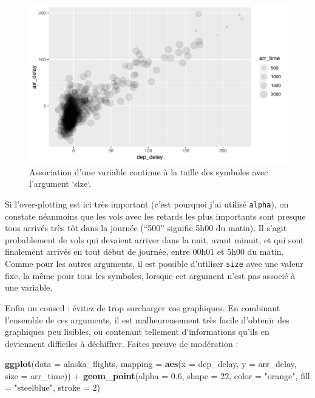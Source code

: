 \documentclass[
  a4paper,
]{article}
\newenvironment{Shaded}{\begin{snugshade}}{\end{snugshade}}
\newcommand{\DataTypeTok}[1]{\textcolor[rgb]{0.00,0.34,0.68}{#1}}
\newcommand{\DecValTok}[1]{\textcolor[rgb]{0.69,0.50,0.00}{#1}}
\newcommand{\FloatTok}[1]{\textcolor[rgb]{0.69,0.50,0.00}{#1}}
\newcommand{\KeywordTok}[1]{\textcolor[rgb]{0.12,0.11,0.11}{\textbf{#1}}}
\newcommand{\NormalTok}[1]{\textcolor[rgb]{0.12,0.11,0.11}{#1}}
\newcommand{\OperatorTok}[1]{\textcolor[rgb]{0.12,0.11,0.11}{#1}}
\newcommand{\StringTok}[1]{\textcolor[rgb]{0.75,0.01,0.01}{#1}}
\begin{document}
\begin{figure}[htpb]

{\centering \includegraphics[width=0.9\linewidth]{figure/sizeplot-1} 

}

\caption{Association d'une variable continue à la taille des symboles avec l'argument `size`.}\label{fig:sizeplot}
\end{figure}

Si l'over-plotting est ici très important (c'est pourquoi j'ai utilisé \texttt{alpha}), on constate néanmoins que les vols avec les retards les plus importants sont presque tous arrivés très tôt dans la journée (``500'' signifie 5h00 du matin). Il s'agit probablement de vols qui devaient arriver dans la nuit, avant minuit, et qui sont finalement arrivés en tout début de journée, entre 00h01 et 5h00 du matin. Comme pour les autres arguments, il est possible d'utiliser \texttt{size} avec une valeur fixe, la même pour tous les symboles, lorsque cet argument n'est pas associé à une variable.

Enfin un conseil : évitez de trop surcharger vos graphiques. En combinant l'ensemble de ces arguments, il est malheureusement très facile d'obtenir des graphiques peu lisibles, ou contenant tellement d'informations qu'ils en deviennent difficiles à déchiffrer. Faites preuve de modération :

\begin{Shaded}
\begin{Highlighting}[]
\KeywordTok{ggplot}\NormalTok{(}\DataTypeTok{data =}\NormalTok{ alaska_flights, }
       \DataTypeTok{mapping =} \KeywordTok{aes}\NormalTok{(}\DataTypeTok{x =}\NormalTok{ dep_delay, }\DataTypeTok{y =}\NormalTok{ arr_delay, }\DataTypeTok{size =}\NormalTok{ arr_time)) }\OperatorTok{+}
\StringTok{  }\KeywordTok{geom_point}\NormalTok{(}\DataTypeTok{alpha =} \FloatTok{0.6}\NormalTok{, }
             \DataTypeTok{shape =} \DecValTok{22}\NormalTok{,}
             \DataTypeTok{color =} \StringTok{"orange"}\NormalTok{,}
             \DataTypeTok{fill =} \StringTok{"steelblue"}\NormalTok{,}
             \DataTypeTok{stroke =} \DecValTok{2}\NormalTok{)}
\end{Highlighting}
\end{Shaded}
\end{document}
